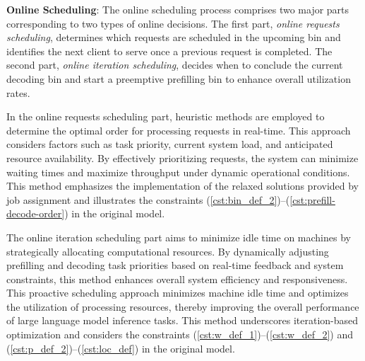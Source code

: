 \textbf{Online Scheduling}: The online scheduling process comprises two major parts corresponding to two types of online decisions. The first part, \textit{online requests scheduling}, determines which requests are scheduled in the upcoming bin and identifies the next client to serve once a previous request is completed. The second part, \textit{online iteration scheduling}, decides when to conclude the current decoding bin and start a preemptive prefilling bin to enhance overall utilization rates.

In the online requests scheduling part, heuristic methods are employed to determine the optimal order for processing requests in real-time. This approach considers factors such as task priority, current system load, and anticipated resource availability. By effectively prioritizing requests, the system can minimize waiting times and maximize throughput under dynamic operational conditions. This method emphasizes the implementation of the relaxed solutions provided by job assignment and illustrates the constraints (\ref{cst:bin_def_2})--(\ref{cst:prefill-decode-order}) in the original model.

The online iteration scheduling part aims to minimize idle time on machines by strategically allocating computational resources. By dynamically adjusting prefilling and decoding task priorities based on real-time feedback and system constraints, this method enhances overall system efficiency and responsiveness. This proactive scheduling approach minimizes machine idle time and optimizes the utilization of processing resources, thereby improving the overall performance of large language model inference tasks. This method underscores iteration-based optimization and considers the constraints (\ref{cst:w_def_1})--(\ref{cst:w_def_2}) and (\ref{cst:p_def_2})--(\ref{cst:loc_def}) in the original model.



